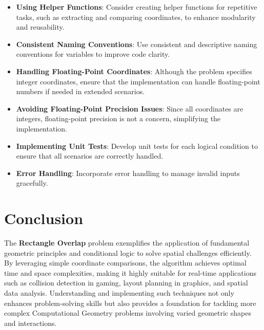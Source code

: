 \begin{itemize}
    \item \textbf{Using Helper Functions}: Consider creating helper functions for repetitive tasks, such as extracting and comparing coordinates, to enhance modularity and reusability.
    
    \item \textbf{Consistent Naming Conventions}: Use consistent and descriptive naming conventions for variables to improve code clarity.
    
    \item \textbf{Handling Floating-Point Coordinates}: Although the problem specifies integer coordinates, ensure that the implementation can handle floating-point numbers if needed in extended scenarios.
    
    \item \textbf{Avoiding Floating-Point Precision Issues}: Since all coordinates are integers, floating-point precision is not a concern, simplifying the implementation.
    
    \item \textbf{Implementing Unit Tests}: Develop unit tests for each logical condition to ensure that all scenarios are correctly handled.
    
    \item \textbf{Error Handling}: Incorporate error handling to manage invalid inputs gracefully.
\end{itemize}

\section*{Conclusion}

The \textbf{Rectangle Overlap} problem exemplifies the application of fundamental geometric principles and conditional logic to solve spatial challenges efficiently. By leveraging simple coordinate comparisons, the algorithm achieves optimal time and space complexities, making it highly suitable for real-time applications such as collision detection in gaming, layout planning in graphics, and spatial data analysis. Understanding and implementing such techniques not only enhances problem-solving skills but also provides a foundation for tackling more complex Computational Geometry problems involving varied geometric shapes and interactions.

\printindex

% 
% 
% 
% 